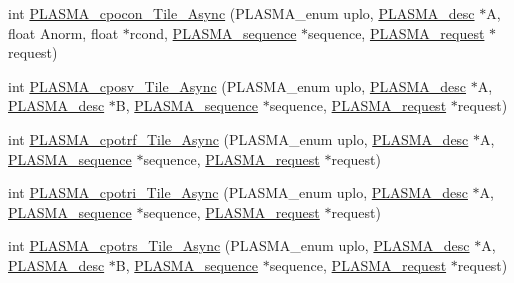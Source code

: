 \begin{DoxyCompactItemize}
int \hyperlink{group__PLASMA__Complex32__t__Tile__Async_gaa1cc0cc7a8d3da023f0cfa98178412ec_gaa1cc0cc7a8d3da023f0cfa98178412ec}{P\+L\+A\+S\+M\+A\+\_\+cpocon\+\_\+\+Tile\+\_\+\+Async} (P\+L\+A\+S\+M\+A\+\_\+enum uplo, \hyperlink{structplasma__desc__t}{P\+L\+A\+S\+M\+A\+\_\+desc} $\ast$A, float Anorm, float $\ast$rcond, \hyperlink{structplasma__sequence__t}{P\+L\+A\+S\+M\+A\+\_\+sequence} $\ast$sequence, \hyperlink{structplasma__request__t}{P\+L\+A\+S\+M\+A\+\_\+request} $\ast$request)
\item 
int \hyperlink{group__PLASMA__Complex32__t__Tile__Async_ga0b1cdf8fba0361b24d4b7c6f089eb794_ga0b1cdf8fba0361b24d4b7c6f089eb794}{P\+L\+A\+S\+M\+A\+\_\+cposv\+\_\+\+Tile\+\_\+\+Async} (P\+L\+A\+S\+M\+A\+\_\+enum uplo, \hyperlink{structplasma__desc__t}{P\+L\+A\+S\+M\+A\+\_\+desc} $\ast$A, \hyperlink{structplasma__desc__t}{P\+L\+A\+S\+M\+A\+\_\+desc} $\ast$B, \hyperlink{structplasma__sequence__t}{P\+L\+A\+S\+M\+A\+\_\+sequence} $\ast$sequence, \hyperlink{structplasma__request__t}{P\+L\+A\+S\+M\+A\+\_\+request} $\ast$request)
\item 
int \hyperlink{group__PLASMA__Complex32__t__Tile__Async_ga6407e36c2859cdffedd0d6467331c458_ga6407e36c2859cdffedd0d6467331c458}{P\+L\+A\+S\+M\+A\+\_\+cpotrf\+\_\+\+Tile\+\_\+\+Async} (P\+L\+A\+S\+M\+A\+\_\+enum uplo, \hyperlink{structplasma__desc__t}{P\+L\+A\+S\+M\+A\+\_\+desc} $\ast$A, \hyperlink{structplasma__sequence__t}{P\+L\+A\+S\+M\+A\+\_\+sequence} $\ast$sequence, \hyperlink{structplasma__request__t}{P\+L\+A\+S\+M\+A\+\_\+request} $\ast$request)
\item 
int \hyperlink{group__PLASMA__Complex32__t__Tile__Async_ga78a2e21a8713c96ac267c4eeaa8005e1_ga78a2e21a8713c96ac267c4eeaa8005e1}{P\+L\+A\+S\+M\+A\+\_\+cpotri\+\_\+\+Tile\+\_\+\+Async} (P\+L\+A\+S\+M\+A\+\_\+enum uplo, \hyperlink{structplasma__desc__t}{P\+L\+A\+S\+M\+A\+\_\+desc} $\ast$A, \hyperlink{structplasma__sequence__t}{P\+L\+A\+S\+M\+A\+\_\+sequence} $\ast$sequence, \hyperlink{structplasma__request__t}{P\+L\+A\+S\+M\+A\+\_\+request} $\ast$request)
\item 
int \hyperlink{group__PLASMA__Complex32__t__Tile__Async_ga8aa2a4ca0bb58c03867ff4786c53ba01_ga8aa2a4ca0bb58c03867ff4786c53ba01}{P\+L\+A\+S\+M\+A\+\_\+cpotrs\+\_\+\+Tile\+\_\+\+Async} (P\+L\+A\+S\+M\+A\+\_\+enum uplo, \hyperlink{structplasma__desc__t}{P\+L\+A\+S\+M\+A\+\_\+desc} $\ast$A, \hyperlink{structplasma__desc__t}{P\+L\+A\+S\+M\+A\+\_\+desc} $\ast$B, \hyperlink{structplasma__sequence__t}{P\+L\+A\+S\+M\+A\+\_\+sequence} $\ast$sequence, \hyperlink{structplasma__request__t}{P\+L\+A\+S\+M\+A\+\_\+request} $\ast$request)

\end{DoxyCompactItemize}
